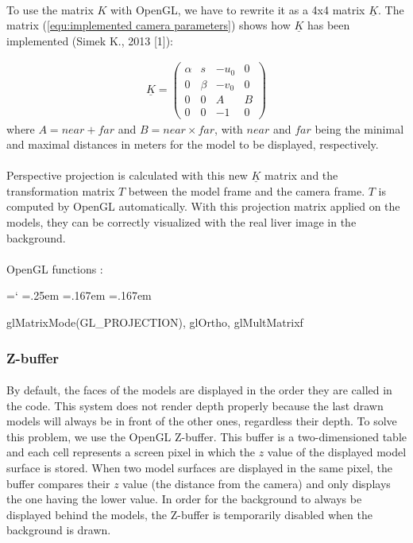 \documentclass[12pt]{report}
\DeclareRobustCommand*{\ttfamily}{
  \origttfamily
  \hyphenchar\font=`\-\relax
  \fontdimen3\font=.25em\relax
  \fontdimen4\font=.167em\relax
  \fontdimen7\font=.167em\relax
}
\newenvironment{code}{\ttfamily}{}
\begin{document}
\paragraph{}
	To use the matrix $K$ with OpenGL, we have to rewrite it as a 4x4 matrix $\underline{K}$. The matrix (\ref{equ:implemented camera parameters}) shows how $\underline{K}$ has been implemented (Simek K., 2013 [1]):

\begin{align}
\underline{K} = \begin{pmatrix}
\alpha& s& -u_0& 0 \\
0& \beta& -v_0& 0 \\
0& 0& A& B\\
0& 0& -1& 0
\end{pmatrix}
\label{equ:implemented camera parameters}
\end{align}
where $A = near + far$ and $B = near \times far$, with $near$ and $far$ being the minimal and maximal distances in meters for the model to be displayed, respectively.

\paragraph{}
	Perspective projection is calculated with this new $\underline{K}$ matrix and the transformation matrix $T$ between the model frame and the camera frame. $T$ is computed by OpenGL automatically. With this projection matrix applied on the models, they can be correctly visualized with the real liver image in the background.


\paragraph{}
	OpenGL functions :

	\begin{code}
	glMatrixMode(GL\_PROJECTION), glOrtho, glMultMatrixf
	\end{code}


\subsubsection{Z-buffer}
\paragraph{}
	By default, the faces of the models are displayed in the order they are called in the code. This system does not render depth properly because the last drawn models will always be in front of the other ones, regardless their depth. To solve this problem, we use the OpenGL Z-buffer. This buffer is a two-dimensioned table and each cell represents a screen pixel in which the $z$ value of the displayed model surface is stored. When two model surfaces are displayed in the same pixel, the buffer compares their $z$ value (the distance from the camera) and only displays the one having the lower value.
	In order for the background to always be displayed behind the models, the Z-buffer is temporarily disabled when the background is drawn.
\end{document}
